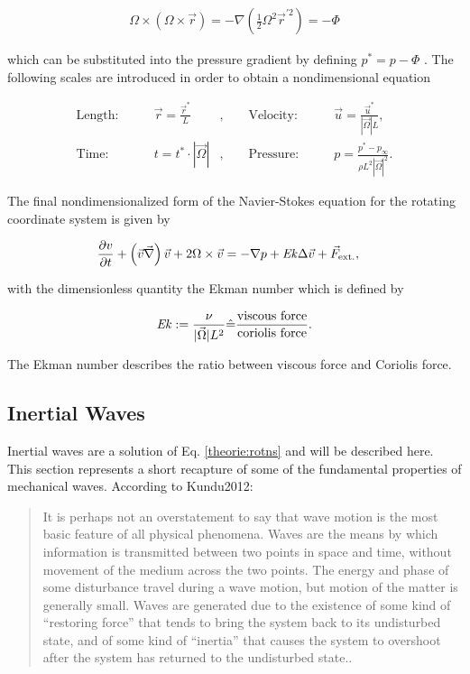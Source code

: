 \begin{align}
    \Omega \times (\Omega \times \vec{r}) = - \nabla \left(\frac{1}{2}\Omega^2\vec{r}^{'2}\right) = -\Phi
\end{align}

which can be substituted into the pressure gradient by defining $p^* = p - \Phi$ \citep{tritton88}.
\newpage
The following scales are introduced in order to obtain a nondimensional equation

\begin{align}
    \text{Length:}\qquad &  \vec{r} = \frac{\vec{r}^*}{L}  &,
    \qquad \text{Velocity:}\qquad& \vec{u} =  \frac{\vec{u}^*}{|\vec{\Omega}|L},\\
    \text{Time:}  \qquad & t = t^* \cdot |\vec{\Omega}| &,
    \qquad  \text{Pressure:}\qquad & p = \frac{p^* - p_\infty}{\rho L^2{|\vec{\Omega}|}^2}.
\end{align}

The final nondimensionalized form of the Navier-Stokes equation for the rotating coordinate system is given by

\begin{align}
    \label{theorie:rotns}
    \pdn[v]{t}+ \left(\vec{v}  \vec{\nabla}\right) \vec{v} + 2\Omega \times \vec{v}  &= -  \nabla p + \Ekman \Delta \vec{v} + \vec{F}_{\text{ext.}},
\end{align}

with the dimensionless quantity the Ekman number which is defined by

\begin{align}
    \mbox{\textit{Ek}} := \frac{\nu}{|\vec{\Omega}| L^2} \hat{=} \frac{\text{viscous force}}{\text{coriolis force}}.
\end{align}

The Ekman number describes the ratio between viscous force and  Coriolis force.

\subsection{Inertial Waves}

Inertial waves are a solution of Eq. \ref{theorie:rotns} and will be described here.
This section represents a short recapture of some of the fundamental properties of mechanical waves. According to {Kundu2012}:

\begin{quote}
It is perhaps not an overstatement to say that wave motion is the most basic feature
of all physical phenomena. Waves are the means by which information is transmitted
between two points in space and time, without movement of the medium across the
two points. The energy and phase of some disturbance travel during a wave motion,
but motion of the matter is generally small. Waves are generated due to the existence of
some kind of “restoring force” that tends to bring the system back to its undisturbed
state, and of some kind of “inertia” that causes the system to overshoot after the
system has returned to the undisturbed state.\cite[p.194]{Kundu2012}.
\end{quote}

